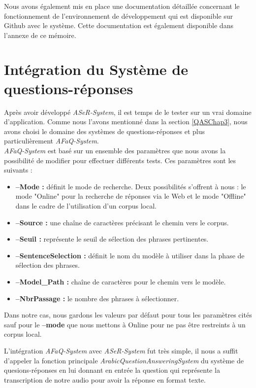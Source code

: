 Nous avons également mis en place une documentation détaillée concernant le fonctionnement de l'environnement de développement qui est disponible sur Github avec le système. Cette documentation est également disponible dans l'annexe de ce mémoire.

\section{Intégration du Système de questions-réponses}
Après avoir développé \textit{ASeR-System}, il est temps de le tester sur un vrai domaine d'application. Comme nous l'avons mentionné dans la section \ref{QASChap3}, nous avons choisi le domaine des systèmes de questions-réponses et plus particulièrement \textit{AFaQ-System}. \\

\textit{AFaQ-System} est basé sur un ensemble des paramètres que nous avons la possibilité de modifier pour effectuer différents tests. Ces paramètres sont les suivants : 
\begin{itemize}
    \item \textbf{--Mode :} définit le mode de recherche. Deux possibilités s'offrent à nous : le mode "Online" pour la recherche de réponses via le Web et le mode "Offline" dans le cadre de l'utilisation d'un corpus local.
    \item \textbf{--Source :} une chaîne de caractères précisant le chemin vers le corpus.
    \item \textbf{--Seuil :} représente le seuil de sélection des phrases pertinentes.
    \item \textbf{--SentenceSelection :} définit le nom du modèle à utiliser dans la phase de sélection des phrases.
    \item \textbf{--Model\_Path :} chaîne de caractères pour le chemin vers le modèle.
    \item \textbf{--NbrPassage :} le nombre des phrases à  sélectionner. \\
\end{itemize}
 
Dans notre cas, nous gardons les valeurs par défaut pour tous les paramètres cités sauf pour le \textbf{--mode} que nous mettons à Online pour ne pas être restreints à un corpus local. 

L'intégration \textit{AFaQ-System} avec \textit{ASeR-System} fut très simple, il nous a suffit d'appeler la fonction principale \textit{ArabicQuestionAnsweringSystem} du système de quesions-réponses en lui donnant en entrée la question qui représente la transcription de notre audio pour avoir la réponse en format texte.

